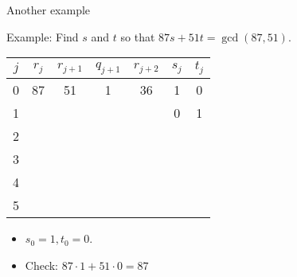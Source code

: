 \documentclass[handout]{beamer}
\begin{document}
\begin{frame}{Another example}

Example: Find $s$ and $t$ so that $87s+51t = \gcd(87, 51)$.

\vspace{1em}

\begin{tabular}{|c|c|c|c|c|c|c|}\hline
$j$   &  $r_{j}$    & $r_{j+1}$ & $q_{j+1}$ & $r_{j+2}$ & $s_j$ & $t_j$ \\ \hline\hline
0     &  87         &  51       &    1      &   36      &  1    &   0   \\ \hline
1     &             &           &           &           &  0    &   1   \\ \hline
2     &             &           &           &           &       &       \\ \hline
3     &             &           &           &           &       &       \\ \hline
4     &             &           &           &           &       &       \\ \hline
5     &             &           &           &           &       &       \\ \hline
\end{tabular}

\vspace{1em}

\begin{itemize}
  \item $s_0 = 1, t_0 = 0$.
  \item Check: $87\cdot 1 + 51\cdot 0 = 87$
\end{itemize}

\end{frame}
\end{document}
